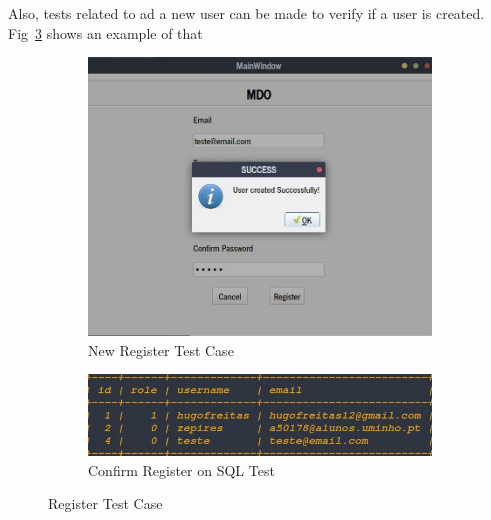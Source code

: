 Also, tests related to ad a new user can be made to verify if a user is created. Fig~\ref{fig:rc-new-register-test} shows an example of that
%
\begin{figure}[htb!]
  \centering
  \begin{subfigure}{.45\textwidth}
    \includegraphics[width=\textwidth]{img/rc-new-register-test.jpg}%
  \caption{New Register Test Case}%
  \label{fig:rc-email-test}
  \end{subfigure}
  \begin{subfigure}{.45\textwidth}
    \includegraphics[width=\textwidth]{img/rc-new-register-sql-test.jpg}%
  \caption{Confirm Register on SQL Test}%
  \label{fig:rc-password-test}
  \end{subfigure}
  \caption{Register Test Case}%
  \label{fig:rc-new-register-test}
\end{figure}
